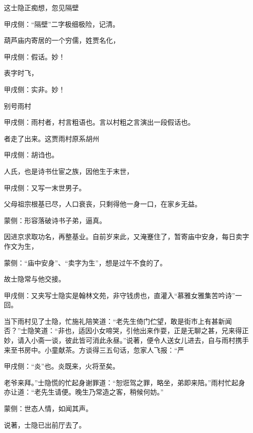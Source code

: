 \begin{parag}
    这士隐正痴想，忽见隔壁\begin{note}甲戌侧：“隔壁”二字极细极险，记清。\end{note}葫芦庙内寄居的一个穷儒，姓贾名化，\begin{note}甲戌侧：假话。妙！\end{note}表字时飞，\begin{note}甲戌侧：实非。妙！\end{note}别号雨村\begin{note}甲戌侧：雨村者，村言粗语也。言以村粗之言演出一段假话也。\end{note}者走了出来。这贾雨村原系胡州\begin{note}甲戌侧：胡诌也。\end{note}人氏，也是诗书仕宦之族，因他生于末世，\begin{note}甲戌侧：又写一末世男子。\end{note}父母祖宗根基已尽，人口衰丧，只剩得他一身一口，在家乡无益。\begin{note}蒙侧：形容落破诗书子弟，逼真。\end{note}因进京求取功名，再整基业。自前岁来此，又淹蹇住了，暂寄庙中安身，每日卖字作文为生，\begin{note}蒙侧：“庙中安身”、“卖字为生”，想是过午不食的了。\end{note}故士隐常与他交接。\begin{note}甲戌侧：又夹写士隐实是翰林文苑，非守钱虏也，直灌入“慕雅女雅集苦吟诗”一回。\end{note}当下雨村见了士隐，忙施礼陪笑道：“老先生倚门伫望，敢是街市上有甚新闻否？”士隐笑道：“非也，适因小女啼哭，引他出来作耍，正是无聊之甚，兄来得正妙，请入小斋一谈，彼此皆可消此永昼。”说著，便令人送女儿进去，自与雨村携手来至书房中。小童献茶。方谈得三五句话，忽家人飞报：“严\begin{note}甲戌侧：“炎”也。炎既来，火将至矣。\end{note}老爷来拜。”士隐慌的忙起身谢罪道：“恕诳驾之罪，略坐，弟即来陪。”雨村忙起身亦让道：“老先生请便。晚生乃常造之客，稍候何妨。”\begin{note}蒙侧：世态人情，如闻其声。\end{note}说著，士隐已出前厅去了。
\end{parag}


